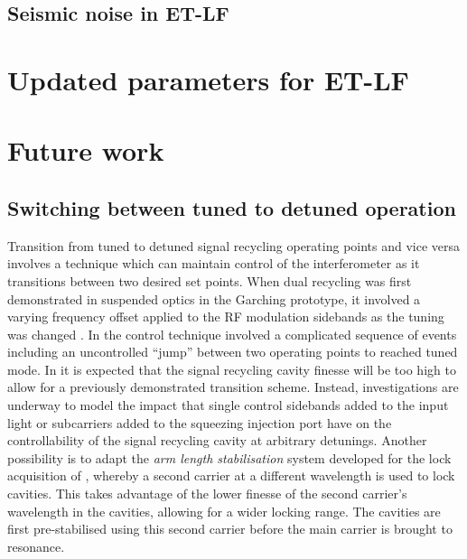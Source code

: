 \subsection{Seismic noise in ET-LF}

\section{Updated parameters for ET-LF}

\section{Future work}

\subsection{Switching between tuned to detuned operation}
Transition from tuned to detuned signal recycling operating points and vice versa involves a technique which can maintain control of the interferometer as it transitions between two desired set points. When dual recycling was first demonstrated in suspended optics in the Garching prototype, it involved a varying frequency offset applied to the \gls{RF} modulation sidebands as the tuning was changed \cite{Freise2000}. In \GEO{} the control technique involved a complicated sequence of events \cite{Grote2004} including an uncontrolled ``jump'' between two operating points \cite{Hild2007} to reached tuned mode. In \ETLF{} it is expected that the signal recycling cavity finesse will be too high to allow for a previously demonstrated transition scheme. Instead, investigations are underway to model the impact that single control sidebands added to the input light or subcarriers added to the squeezing injection port have on the controllability of the signal recycling cavity at arbitrary detunings. Another possibility is to adapt the \emph{arm length stabilisation} system developed for the lock acquisition of \ALIGO{} \cite{Mullavey2012, Staley2014}, whereby a second carrier at a different wavelength is used to lock cavities. This takes advantage of the lower finesse of the second carrier's wavelength in the cavities, allowing for a wider locking range. The cavities are first pre-stabilised using this second carrier before the main carrier is brought to resonance.

